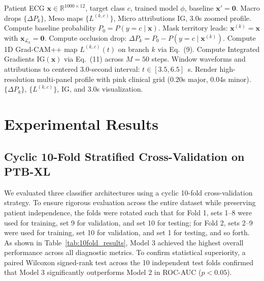 \documentclass[12pt]{elsarticle}
\begin{document}
\begin{algorithm}[t]
\caption{Multi-Scale Anatomical Attribution Inference}
\label{alg:xai_inference}
\begin{algorithmic}[1]
\REQUIRE Patient ECG $\mathbf{x} \in \mathbb{R}^{1000 \times 12}$, target class $c$, trained model $\phi$, baseline $\mathbf{x}' = \mathbf{0}$.
\ENSURE Macro drops $\{\Delta P_k\}$, Meso maps $\{L^{(k, c)}\}$, Micro attributions $\text{IG}$, 3.0s zoomed profile.
\STATE Compute baseline probability $P_0 = P(y = c \mid \mathbf{x})$.
    \STATE Mask territory leads: $\mathbf{x}^{(k)} = \mathbf{x}$ with $\mathbf{x}_{\mathcal{L}_k} = \mathbf{0}$.
    \STATE Compute occlusion drop: $\Delta P_k = P_0 - P(y = c \mid \mathbf{x}^{(k)})$.
    \STATE Compute 1D Grad-CAM++ map $L^{(k, c)}(t)$ on branch $k$ via Eq.~(9).
\ENDFOR
\STATE Compute Integrated Gradients $\text{IG}(\mathbf{x})$ via Eq.~(11) across $M=50$ steps.
\STATE Window waveforms and attributions to centered 3.0-second interval: $t \in [3.5, 6.5]$~s.
\STATE Render high-resolution multi-panel profile with pink clinical grid (0.20s major, 0.04s minor).
\RETURN $\{\Delta P_k\}$, $\{L^{(k, c)}\}$, $\text{IG}$, and 3.0s visualization.
\end{algorithmic}
\end{algorithm}


\section{Experimental Results}
\label{sec:results}

\subsection{Cyclic 10-Fold Stratified Cross-Validation on PTB-XL}
We evaluated three classifier architectures using a cyclic 10-fold cross-validation strategy. To ensure rigorous evaluation across the entire dataset while preserving patient independence, the folds were rotated such that for Fold 1, sets 1--8 were used for training, set 9 for validation, and set 10 for testing; for Fold 2, sets 2--9 were used for training, set 10 for validation, and set 1 for testing, and so forth. As shown in Table~\ref{tab:10fold_results}, Model 3 achieved the highest overall performance across all diagnostic metrics. To confirm statistical superiority, a paired Wilcoxon signed-rank test across the 10 independent test folds confirmed that Model 3 significantly outperforms Model 2 in ROC-AUC ($p < 0.05$).
\end{document}
